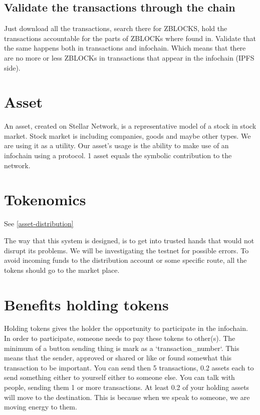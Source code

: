 \documentclass[10pt,a4paper,twocolumn]{paper}
\begin{document}
	\subsection{Validate the transactions through the chain}
	Just download all the transactions, search there for ZBLOCKS, hold the transactions accountable for the parts of ZBLOCKs where found in. Validate that the same happens both in transactions and infochain. Which means that there are no more or less ZBLOCKs in transactions that appear in the infochain (IPFS side).
	
	\section{Asset}\label{asset}
	An asset, created on Stellar Network, is a representative model of a stock in stock market. Stock market is including companies, goods and maybe other types. We are using it as a utility. Our asset's usage is the ability to make use of an infochain using a protocol. 1 asset equals the symbolic contribution to the network.

	\section{Tokenomics}\label{tokenomics}
	See \ref{asset-distribution}
	
	The way that this system is designed, is to get into trusted hands that would not disrupt its problems. We will be investigating the testnet for possible errors. To avoid incoming funds to the distribution account or some specific route, all the tokens should go to the market place.

	\section{Benefits holding tokens}
	Holding tokens gives the holder the opportunity to participate in the infochain. In order to participate, someone needs to pay these tokens to other(s). The minimum of a button sending thing is mark as a `transaction\_number`. This means that the sender, approved or shared or like or found somewhat this transaction to be important. You can send then 5 transactions, 0.2 assets each to send something either to yourself either to someone else. You can talk with people, sending them 1 or more transactions. At least 0.2 of your holding assets will move to the destination. This is because when we speak to someone, we are moving energy to them.
\end{document}
